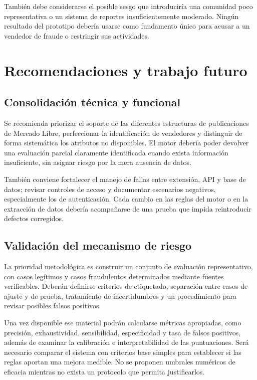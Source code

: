 También debe considerarse el posible sesgo que introduciría una comunidad poco representativa o un sistema de reportes insuficientemente moderado. Ningún resultado del prototipo debería usarse como fundamento único para acusar a un vendedor de fraude o restringir sus actividades.

\section{Recomendaciones y trabajo futuro}\label{sec:ml-recomendaciones}

\subsection{Consolidación técnica y funcional}\label{subsec:ml-recomendaciones-tecnicas}

Se recomienda priorizar el soporte de las diferentes estructuras de publicaciones de Mercado Libre, perfeccionar la identificación de vendedores y distinguir de forma sistemática los atributos no disponibles. El motor debería poder devolver una evaluación parcial claramente identificada cuando exista información insuficiente, sin asignar riesgo por la mera ausencia de datos.

También conviene fortalecer el manejo de fallas entre extensión, API y base de datos; revisar controles de acceso y documentar escenarios negativos, especialmente los de autenticación. Cada cambio en las reglas del motor o en la extracción de datos debería acompañarse de una prueba que impida reintroducir defectos corregidos.

\subsection{Validación del mecanismo de riesgo}\label{subsec:ml-recomendaciones-validacion}

La prioridad metodológica es construir un conjunto de evaluación representativo, con casos legítimos y casos fraudulentos determinados mediante fuentes verificables. Deberán definirse criterios de etiquetado, separación entre casos de ajuste y de prueba, tratamiento de incertidumbres y un procedimiento para revisar posibles falsos positivos.

Una vez disponible ese material podrán calcularse métricas apropiadas, como precisión, exhaustividad, sensibilidad, especificidad y tasa de falsos positivos, además de examinar la calibración e interpretabilidad de las puntuaciones. Será necesario comparar el sistema con criterios base simples para establecer si las reglas aportan una mejora medible. No se proponen umbrales numéricos de eficacia mientras no exista un protocolo que permita justificarlos.

